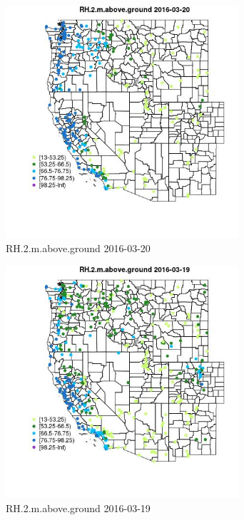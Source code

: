 \begin{figure} 
\centering  
\includegraphics[width=0.77\textwidth]{Code_Outputs/Report_ML_input_PM25_Step4_part_e_de_duplicated_aveswNAs_MapObsRH2maboveground2016-03-20.jpg} 
\caption{\label{fig:Report_ML_input_PM25_Step4_part_e_de_duplicated_aveswNAsMapObsRH2maboveground2016-03-20}RH.2.m.above.ground 2016-03-20} 
\end{figure} 
 

\begin{figure} 
\centering  
\includegraphics[width=0.77\textwidth]{Code_Outputs/Report_ML_input_PM25_Step4_part_e_de_duplicated_aveswNAs_MapObsRH2maboveground2016-03-19.jpg} 
\caption{\label{fig:Report_ML_input_PM25_Step4_part_e_de_duplicated_aveswNAsMapObsRH2maboveground2016-03-19}RH.2.m.above.ground 2016-03-19} 
\end{figure} 
 


